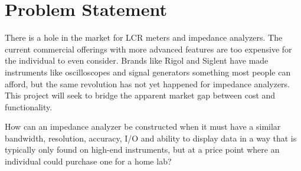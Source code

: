 \chapter{Problem Statement} \label{ch:ProblemStatement}
There is a hole in the market for LCR meters and impedance analyzers. The current commercial offerings with more advanced features are too expensive for the individual to even consider. Brands like Rigol and Siglent have made instruments like oscilloscopes and signal generators something most people can afford, but the same revolution has not yet happened for impedance analyzers. This project will seek to bridge the apparent market gap between cost and functionality.

How can an impedance analyzer be constructed when it must have a similar bandwidth, resolution, accuracy, I/O and ability to display data in a way that is typically only found on high-end instruments, but at a price point where an individual could purchase one for a home lab?